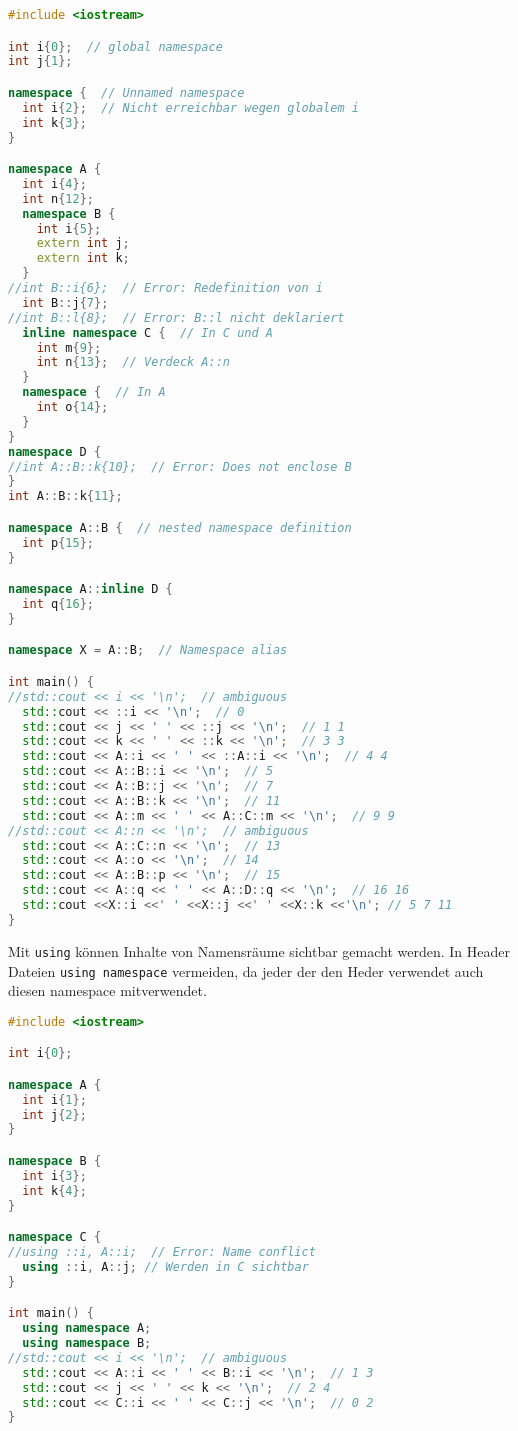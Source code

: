 \documentclass[10pt,twocolumn]{scrartcl}
\begin{document}
\begin{lstlisting}[language=C++]
#include <iostream>

int i{0};  // global namespace
int j{1};

namespace {  // Unnamed namespace
  int i{2};  // Nicht erreichbar wegen globalem i
  int k{3};
}

namespace A {
  int i{4};
  int n{12};
  namespace B {
    int i{5};
    extern int j;
    extern int k;
  }
//int B::i{6};  // Error: Redefinition von i
  int B::j{7};
//int B::l{8};  // Error: B::l nicht deklariert
  inline namespace C {  // In C und A
    int m{9};
    int n{13};  // Verdeck A::n
  }
  namespace {  // In A
    int o{14};
  }
}
namespace D {
//int A::B::k{10};  // Error: Does not enclose B
}
int A::B::k{11};

namespace A::B {  // nested namespace definition
  int p{15};
}

namespace A::inline D {
  int q{16};
}

namespace X = A::B;  // Namespace alias

int main() {
//std::cout << i << '\n';  // ambiguous
  std::cout << ::i << '\n';  // 0
  std::cout << j << ' ' << ::j << '\n';  // 1 1
  std::cout << k << ' ' << ::k << '\n';  // 3 3
  std::cout << A::i << ' ' << ::A::i << '\n';  // 4 4
  std::cout << A::B::i << '\n';  // 5
  std::cout << A::B::j << '\n';  // 7
  std::cout << A::B::k << '\n';  // 11
  std::cout << A::m << ' ' << A::C::m << '\n';  // 9 9
//std::cout << A::n << '\n';  // ambiguous
  std::cout << A::C::n << '\n';  // 13
  std::cout << A::o << '\n';  // 14
  std::cout << A::B::p << '\n';  // 15
  std::cout << A::q << ' ' << A::D::q << '\n';  // 16 16
  std::cout <<X::i <<' ' <<X::j <<' ' <<X::k <<'\n'; // 5 7 11
}
\end{lstlisting}

Mit \lstinline|using| können Inhalte von Namensräume sichtbar gemacht werden. In
Header Dateien \lstinline|using namespace| vermeiden, da jeder der den Heder
verwendet auch diesen namespace mitverwendet.

\begin{lstlisting}[language=C++]
#include <iostream>

int i{0};

namespace A {
  int i{1};
  int j{2};
}

namespace B {
  int i{3};
  int k{4};
}

namespace C {
//using ::i, A::i;  // Error: Name conflict
  using ::i, A::j; // Werden in C sichtbar
}

int main() {
  using namespace A;
  using namespace B;
//std::cout << i << '\n';  // ambiguous
  std::cout << A::i << ' ' << B::i << '\n';  // 1 3
  std::cout << j << ' ' << k << '\n';  // 2 4
  std::cout << C::i << ' ' << C::j << '\n';  // 0 2
}
\end{lstlisting}
\end{document}
